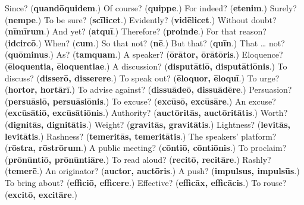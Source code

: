 \begin{tcolorbox}[breakable,colback=teal!4,colframe=teal!35!black,title={Before you move on}]
Since? (\textbf{quandōquidem}.) Of course? (\textbf{quippe}.) For indeed? (\textbf{etenim}.) Surely? (\textbf{nempe}.) To be sure? (\textbf{scīlicet}.) Evidently? (\textbf{vidēlicet}.) Without doubt? (\textbf{nīmīrum}.) And yet? (\textbf{atquī}.) Therefore? (\textbf{proinde}.) For that reason? (\textbf{idcircō}.) When? (\textbf{cum}.) So that not? (\textbf{nē}.) But that? (\textbf{quīn}.) That … not? (\textbf{quōminus}.) As? (\textbf{tamquam}.) A speaker? (\textbf{ōrātor, ōrātōris}.) Eloquence? (\textbf{ēloquentia, ēloquentiae}.) A discussion? (\textbf{disputātiō, disputātiōnis}.) To discuss? (\textbf{disserō, disserere}.) To speak out? (\textbf{ēloquor, ēloquī}.) To urge? (\textbf{hortor, hortārī}.) To advise against? (\textbf{dissuādeō, dissuādēre}.) Persuasion? (\textbf{persuāsiō, persuāsiōnis}.) To excuse? (\textbf{excūsō, excūsāre}.) An excuse? (\textbf{excūsātiō, excūsātiōnis}.) Authority? (\textbf{auctōritās, auctōritātis}.) Worth? (\textbf{dignitās, dignitātis}.) Weight? (\textbf{gravitās, gravitātis}.) Lightness? (\textbf{levitās, levitātis}.) Rashness? (\textbf{temeritās, temeritātis}.) The speakers' platform? (\textbf{rōstra, rōstrōrum}.) A public meeting? (\textbf{cōntiō, cōntiōnis}.) To proclaim? (\textbf{prōnūntiō, prōnūntiāre}.) To read aloud? (\textbf{recitō, recitāre}.) Rashly? (\textbf{temerē}.) An originator? (\textbf{auctor, auctōris}.) A push? (\textbf{impulsus, impulsūs}.) To bring about? (\textbf{efficiō, efficere}.) Effective? (\textbf{efficāx, efficācis}.) To rouse? (\textbf{excitō, excitāre}.)
\end{tcolorbox}
